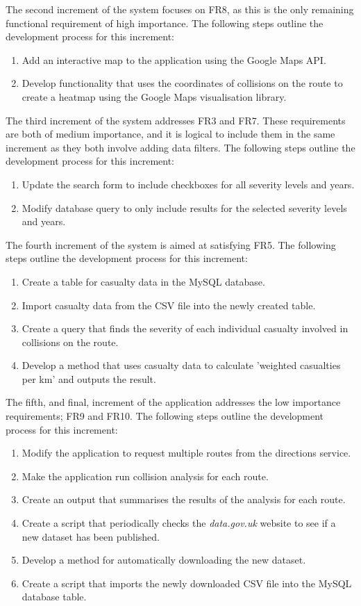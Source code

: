 \documentclass[authoryearcitations]{UoYCSproject}
\begin{document}
The second increment of the system focuses on FR8, as this is the only remaining functional requirement of high importance. The following steps outline the development process for this increment:
\begin{enumerate}
	\item Add an interactive map to the application using the Google Maps API.
	\item Develop functionality that uses the coordinates of collisions on the route to create a heatmap using the Google Maps visualisation library.
\end{enumerate}

The third increment of the system addresses FR3 and FR7. These requirements are both of medium importance, and it is logical to include them in the same increment as they both involve adding data filters. The following steps outline the development process for this increment:
\begin{enumerate}
	\item Update the search form to include checkboxes for all severity levels and years.
	\item Modify database query to only include results for the selected severity levels and years.
\end{enumerate}

The fourth increment of the system is aimed at satisfying FR5. The following steps outline the development process for this increment:
\begin{enumerate}
	\item Create a table for casualty data in the MySQL database.
	\item Import casualty data from the CSV file into the newly created table. 
	\item Create a query that finds the severity of each individual casualty involved in collisions on the route.
	\item Develop a method that uses casualty data to calculate 'weighted casualties per km' and outputs the result.	
\end{enumerate}

The fifth, and final, increment of the application addresses the low importance requirements; FR9 and FR10. The following steps outline the development process for this increment:
\begin{enumerate}
	\item Modify the application to request multiple routes from the directions service.
	\item Make the application run collision analysis for each route.
	\item Create an output that summarises the results of the analysis for each route.
	\item Create a script that periodically checks the \textit{data.gov.uk} website to see if a new dataset has been published.
	\item Develop a method for automatically downloading the new dataset.
	\item Create a script that imports the newly downloaded CSV file into the MySQL database table.
\end{enumerate}
\end{document}
